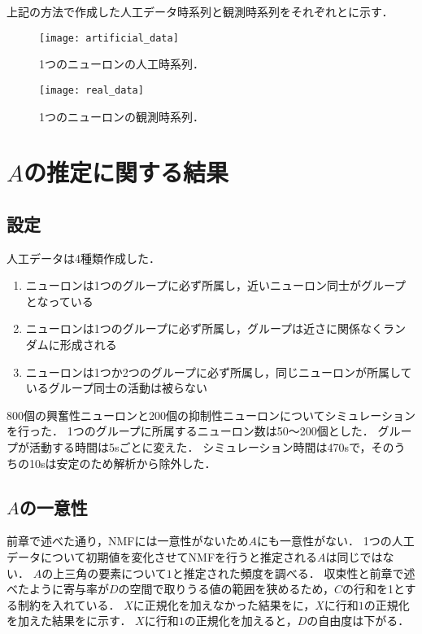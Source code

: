 上記の方法で作成した人工データ時系列と観測時系列をそれぞれとに示す．
\begin{figure}[htbp]
    \begin{minipage}{0.5\hsize}
			\begin{center}
					\texttt{[image: artificial\_data]}
					\caption{1つのニューロンの人工時系列．}
					\label{fig:art}
			\end{center}
		\end{minipage}
    \begin{minipage}{0.5\hsize}
			\begin{center}
					\texttt{[image: real\_data]}
					\caption{1つのニューロンの観測時系列．}
					\label{fig:dat}
			\end{center}
		\end{minipage}
\end{figure}

\section{$A$の推定に関する結果}
\subsection{設定}
人工データは4種類作成した．
\begin{enumerate}
  \item ニューロンは1つのグループに必ず所属し，近いニューロン同士がグループとなっている
  \item ニューロンは1つのグループに必ず所属し，グループは近さに関係なくランダムに形成される
  \item ニューロンは1つか2つのグループに必ず所属し，同じニューロンが所属しているグループ同士の活動は被らない
\end{enumerate}
800個の興奮性ニューロンと200個の抑制性ニューロンについてシミュレーションを行った．
1つのグループに所属するニューロン数は50〜200個とした．
グループが活動する時間は5sごとに変えた．
シミュレーション時間は470sで，そのうちの10sは安定のため解析から除外した．

\subsection{$A$の一意性}
前章で述べた通り，NMFには一意性がないため$A$にも一意性がない．
1つの人工データについて初期値を変化させてNMFを行うと推定される$A$は同じではない．
$A$の上三角の要素について$1$と推定された頻度を調べる．
収束性と前章で述べたように寄与率が$D$の空間で取りうる値の範囲を狭めるため，$C$の行和を1とする制約を入れている．
$X$に正規化を加えなかった結果をに，$X$に行和$1$の正規化を加えた結果をに示す．
$X$に行和$1$の正規化を加えると，$D$の自由度は下がる．

